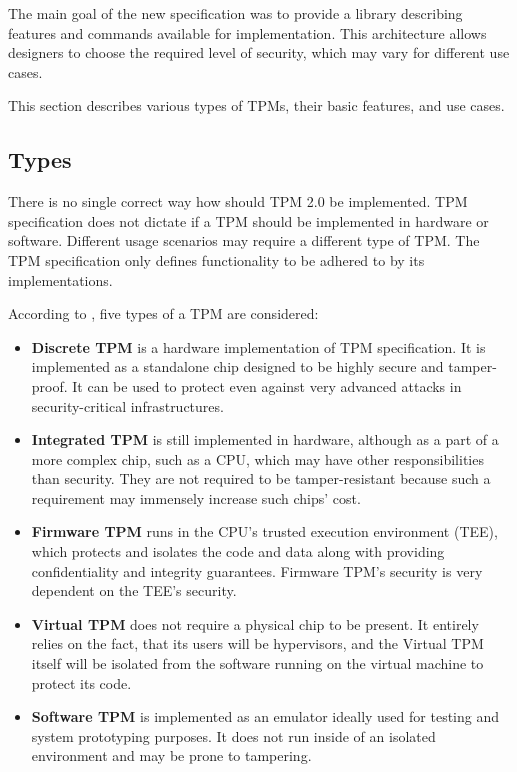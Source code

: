 The main goal of the new specification was to provide a library describing features and commands available for implementation. This architecture allows designers to choose the required level of security, which may vary for different use cases. 

This section describes various types of TPMs, their basic features, and use cases.

\subsection{Types}
There is no single correct way how should TPM 2.0 be implemented. TPM specification does not dictate if a TPM should be implemented in hardware or software. Different usage scenarios may require a different type of TPM. The TPM specification only defines functionality to be adhered to by its implementations. 

According to \cite{tcg_tpm2_briefintro}, five types of a TPM are considered:

\begin{itemize}
    \item \textbf{Discrete TPM} is a hardware implementation of TPM specification. It is implemented as a standalone chip designed to be highly secure and tamper-proof. It can be used to protect even against very advanced attacks in security-critical infrastructures.
    \item \textbf{Integrated TPM} is still implemented in hardware, although as a part of a more complex chip, such as a CPU, which may have other responsibilities than security. They are not required to be tamper-resistant because such a requirement may immensely increase such chips' cost.
    \item \textbf{Firmware TPM} runs in the CPU's trusted execution environment (TEE), which protects and isolates the code and data along with providing confidentiality and integrity guarantees. Firmware TPM's security is very dependent on the TEE's security.
    \item \textbf{Virtual TPM} does not require a physical chip to be present. It entirely relies on the fact, that its users will be hypervisors, and the Virtual TPM itself will be isolated from the software running on the virtual machine to protect its code. 
    \item \textbf{Software TPM} is implemented as an emulator ideally used for testing and system prototyping purposes. It does not run inside of an isolated environment and may be prone to tampering.
\end{itemize}

